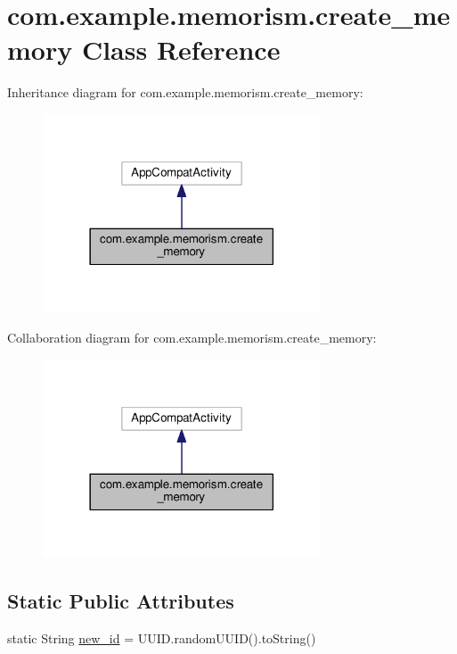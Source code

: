 \hypertarget{classcom_1_1example_1_1memorism_1_1create__memory}{}\section{com.\+example.\+memorism.\+create\+\_\+memory Class Reference}
\label{classcom_1_1example_1_1memorism_1_1create__memory}


Inheritance diagram for com.\+example.\+memorism.\+create\+\_\+memory\+:\nopagebreak
\begin{figure}[H]
\begin{center}
\leavevmode
\includegraphics[width=234pt]{d0/dd9/classcom_1_1example_1_1memorism_1_1create__memory__inherit__graph}
\end{center}
\end{figure}


Collaboration diagram for com.\+example.\+memorism.\+create\+\_\+memory\+:\nopagebreak
\begin{figure}[H]
\begin{center}
\leavevmode
\includegraphics[width=234pt]{d8/d29/classcom_1_1example_1_1memorism_1_1create__memory__coll__graph}
\end{center}
\end{figure}
\subsection*{Static Public Attributes}
\begin{DoxyCompactItemize}
\item 
static String \hyperlink{classcom_1_1example_1_1memorism_1_1create__memory_a6ca3be37a6f7c9d83536809cfbd99dc1}{new\+\_\+id} = U\+U\+I\+D.\+random\+U\+U\+ID().to\+String()
\end{DoxyCompactItemize}
